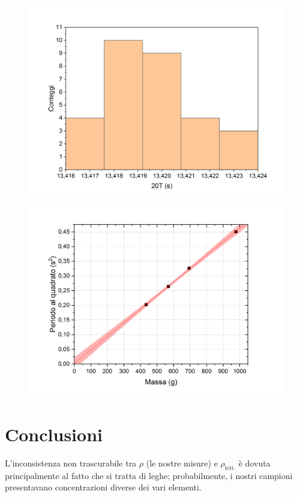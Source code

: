 \documentclass{article}
\begin{document}
\begin{figure}[h]
    \includegraphics[width=\textwidth]{Dinamico4.jpg}
    \includegraphics[width=\textwidth]{DinamicoReg.jpg}
\end{figure}

\section{Conclusioni}

L'inconsistenza non trascurabile tra $\rho$ (le nostre misure) e $\rho_\text{lett.}$ è dovuta principalmente al fatto che si tratta di leghe; probabilmente, i nostri campioni presentavano concentrazioni diverse dei vari elementi.
\end{document}
